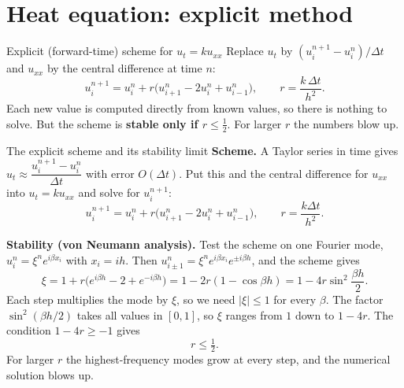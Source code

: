\section{Heat equation: explicit method}

\begin{methodbox}{Explicit (forward-time) scheme for $u_t = ku_{xx}$}
Replace $u_t$ by $(u_i^{n+1}-u_i^n)/\Delta t$ and $u_{xx}$ by the central difference at time $n$:
\[ u_i^{n+1} = u_i^n + r\big(u_{i+1}^n - 2u_i^n + u_{i-1}^n\big),\qquad r = \frac{k\,\Delta t}{h^2}. \]
Each new value is computed directly from known values, so there is nothing to solve. But the scheme is \textbf{stable only if $r\le\frac12$}. For larger $r$ the numbers blow up.
\end{methodbox}

\begin{derivbox}{The explicit scheme and its stability limit}
\textbf{Scheme.} A Taylor series in time gives $u_t\approx\dfrac{u_i^{n+1} - u_i^n}{\Delta t}$ with error $O(\Delta t)$. Put this and the central difference for $u_{xx}$ into $u_t = ku_{xx}$ and solve for $u_i^{n+1}$:
\[ u_i^{n+1} = u_i^n + r\big(u_{i+1}^n - 2u_i^n + u_{i-1}^n\big),\qquad r = \frac{k\Delta t}{h^2}. \]

\textbf{Stability (von Neumann analysis).} Test the scheme on one Fourier mode, $u_i^n = \xi^n e^{i\beta x_i}$ with $x_i = ih$. Then $u_{i\pm1}^n = \xi^ne^{i\beta x_i}e^{\pm i\beta h}$, and the scheme gives
\[ \xi = 1 + r\big(e^{i\beta h} - 2 + e^{-i\beta h}\big) = 1 - 2r(1-\cos\beta h) = 1 - 4r\sin^2\frac{\beta h}{2}. \]
Each step multiplies the mode by $\xi$, so we need $|\xi|\le1$ for every $\beta$. The factor $\sin^2(\beta h/2)$ takes all values in $[0,1]$, so $\xi$ ranges from $1$ down to $1-4r$. The condition $1 - 4r\ge-1$ gives
\[ r\le\tfrac12 . \]
For larger $r$ the highest-frequency modes grow at every step, and the numerical solution blows up.
\end{derivbox}


